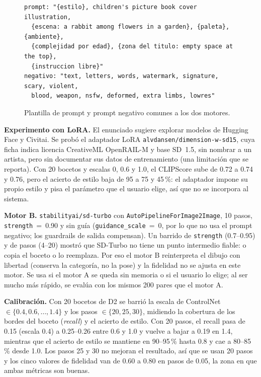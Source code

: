 \documentclass[10pt,a4paper,twocolumn]{article}
\begin{document}
\begin{figure}[t]
\begin{lstlisting}
prompt: "{estilo}, children's picture book cover illustration,
  {escena: a rabbit among flowers in a garden}, {paleta}, {ambiente},
  {complejidad por edad}, {zona del titulo: empty space at the top},
  {instruccion libre}"
negativo: "text, letters, words, watermark, signature, scary, violent,
  blood, weapon, nsfw, deformed, extra limbs, lowres"
\end{lstlisting}
\caption{Plantilla de prompt y prompt negativo comunes a los dos motores.}\label{fig:prompt}
\end{figure}
\textbf{Experimento con LoRA.} El enunciado sugiere explorar modelos de Hugging Face y Civitai. Se probó el adaptador LoRA \texttt{alvdansen/dimension-w-sd15}, cuya ficha indica licencia CreativeML OpenRAIL-M y base SD~1.5, sin nombrar a un artista, pero sin documentar sus datos de entrenamiento (una limitación que se reporta). Con 20 bocetos y escalas 0, 0.6 y 1.0, el CLIPScore sube de 0.72 a 0.74 y 0.76, pero el acierto de estilo baja de 95 a 75 y 45\,\%: el adaptador impone su propio estilo y pisa el parámetro que el usuario elige, así que no se incorpora al sistema.

\textbf{Motor B.} \texttt{stabilityai/sd-turbo} con \texttt{AutoPipelineForImage2Image}, 10 pasos, \texttt{strength}~=~0.90 y sin guía (\texttt{guidance\_scale}~=~0, por lo que no usa el prompt negativo; los guardrails de salida compensan). Un barrido de \texttt{strength} (0.7--0.95) y de pasos (4--20) mostró que SD-Turbo no tiene un punto intermedio fiable: o copia el boceto o lo reemplaza. Por eso el motor B reinterpreta el dibujo con libertad (conserva la categoría, no la pose) y la fidelidad no se ajusta en este motor. Se usa si el motor A se queda sin memoria o si el usuario lo elige; al ser mucho más rápido, se evalúa con los mismos 200 pares que el motor A.

\textbf{Calibración.} Con 20 bocetos de D2 se barrió la escala de ControlNet $\in\{0.4,0.6,\dots,1.4\}$ y los pasos $\in\{20,25,30\}$, midiendo la cobertura de los bordes del boceto (\emph{recall}) y el acierto de estilo. Con 20 pasos, el recall pasa de 0.15 (escala 0.4) a 0.25--0.26 entre 0.6 y 1.0 y vuelve a bajar a 0.19 en 1.4, mientras que el acierto de estilo se mantiene en 90--95\,\% hasta 0.8 y cae a 80--85\,\% desde 1.0. Los pasos 25 y 30 no mejoran el resultado, así que se usan 20 pasos y los cinco valores de fidelidad van de 0.60 a 0.80 en pasos de 0.05, la zona en que ambas métricas son buenas.
\end{document}
